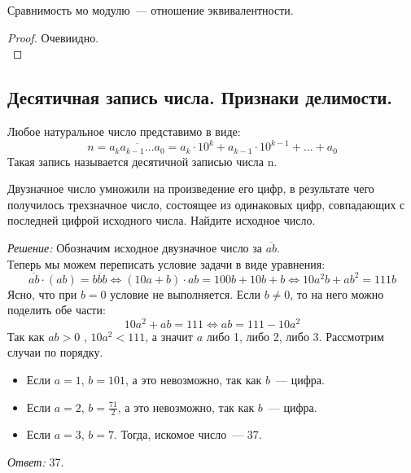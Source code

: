 \documentclass[11pt]{article}
\begin{document}
\begin{statement}

    Сравнимость мо модулю~--- отношение эквивалентности.

\end{statement}
\begin{proof} Очевиидно. \\

\end{proof}

\subsection{Десятичная запись числа. Признаки делимости.}

\begin{definition}
    Любое натуральное число представимо в виде:
\[ n = \overline{a_{k}a_{k - 1}\ldots a_0} = a_k \cdot 10^k + a_{k - 1} \cdot 10^{k -1} + \ldots + a_0 \]
Такая запись называется десятичной записью числа n.
\end{definition}

\begin{example}
	Двузначное число умножили на произведение его цифр, в результате чего получилось трехзначное число, состоящее из одинаковых цифр, совпадающих с последней цифрой исходного числа. Найдите исходное число.
\end{example}
\textit{Решение:}
Обозначим исходное двузначное число за $\overline{ab}$.\\
Теперь мы можем переписать условие задачи в виде уравнения:
\[ \overline{ab} \cdot (ab) = \overline{bbb} \Leftrightarrow
(10a + b) \cdot ab = 100b + 10b + b \Leftrightarrow
10a^2b + ab^2 = 111b \]
Ясно, что при $b = 0$ условие не выполняется. Если $b \neq 0$, то на него можно поделить обе части:
\[10a^2 + ab = 111 \Leftrightarrow ab = 111 - 10a^2\]
Так как $ab > 0$ , $10a^2 < 111$, а значит $a$ либо 1, либо 2, либо 3. Рассмотрим случаи по порядку.
\begin{itemize}
	\item Если $a = 1$, $b = 101$, а это невозможно, так как $b$~--- цифра.
	\item Если $a = 2$, $b = \frac{71}{2}$, а это невозможно, так как $b$~--- цифра.
	\item Если $a = 3$, $b = 7$. Тогда, искомое число~--- 37.
\end{itemize}
\textit{Ответ:} 37.
\end{document}
